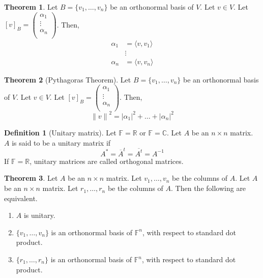 \documentclass[fleqn, a5paper, 10pt]{amsart}
\theoremstyle{definition}
\newtheorem{definition}{Definition} %
\theoremstyle{theorem}
\newtheorem{theorem}{Theorem} %
\theoremstyle{remark}
\numberwithin{corollary}{theorem}
\numberwithin{equation}{theorem}
\begin{document}
\begin{theorem}
	Let $B = \{v_1, \dots, v_n\}$ be an orthonormal basis of $V$. Let $v \in V$. Let $[v]_B = 
		\begin{pmatrix}
			\alpha_1\\
			\vdots\\
			\alpha_n\\
		\end{pmatrix}
		$.
	Then,
	\begin{align*}
		\alpha_1 &= \langle v, v_1 \rangle\\
		&\vdots\\
		\alpha_n &= \langle v, v_n \rangle
	\end{align*}
\end{theorem}

\begin{theorem}[Pythagoras Theorem]\label{Pythagoras Theorem}
	Let $B = \{v_1, \dots, v_n\}$ be an orthonormal basis of $V$. Let $v \in V$. Let $[v]_B = 
		\begin{pmatrix}
			\alpha_1\\
			\vdots\\
			\alpha_n\\
		\end{pmatrix}
		$.
	Then,
	\begin{equation*}
		{\| v \|}^2 = |\alpha_1|^2 + \dots + |\alpha_n|^2
	\end{equation*}
\end{theorem}

\begin{definition}[Unitary matrix]
	Let $\mathbb{F} = \mathbb{R}$ or $\mathbb{F} = \mathbb{C}$. Let $A$ be an $n \times n$ matrix. $A$ is said to be a unitary matrix if
	\begin{equation*}
		A^* = \overline{A}^t = \overline{A^t} = A^{-1}
	\end{equation*}
	If $\mathbb{F} = \mathbb{R}$, unitary matrices are called orthogonal matrices.
\end{definition}

\begin{theorem}
	Let $A$ be an $n \times n$ matrix. Let $v_1, \dots, v_n$ be the columns of $A$. Let $A$ be an $n \times n$ matrix. Let $r_1, \dots, r_n$ be the columns of $A$.
	Then the following are equivalent.
	\begin{enumerate}
		\item $A$ is unitary.
		\item $\{v_1, \dots, v_n\}$ is an orthonormal basis of $\mathbb{F}^n$, with respect to standard dot product.
		\item $\{r_1, \dots, r_n\}$ is an orthonormal basis of $\mathbb{F}^n$, with respect to standard dot product.
	\end{enumerate}
\end{theorem}
\end{document}
